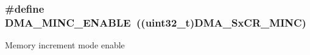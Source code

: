 \subsubsection[{\texorpdfstring{D\+M\+A\+\_\+\+M\+I\+N\+C\+\_\+\+E\+N\+A\+B\+LE}{DMA_MINC_ENABLE}}]{\setlength{\rightskip}{0pt plus 5cm}\#define D\+M\+A\+\_\+\+M\+I\+N\+C\+\_\+\+E\+N\+A\+B\+LE~((uint32\+\_\+t)D\+M\+A\+\_\+\+Sx\+C\+R\+\_\+\+M\+I\+NC)}\hypertarget{group___d_m_a___memory__incremented__mode_ga43d30885699cc8378562316ff4fed1cd}{}\label{group___d_m_a___memory__incremented__mode_ga43d30885699cc8378562316ff4fed1cd}
Memory increment mode enable 